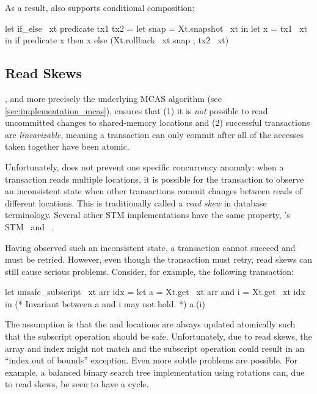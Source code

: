 As a result, \Kcas also supports conditional composition:
\begin{ocamlcode}
let if_else ~xt predicate tx1 tx2 =
  let snap = Xt.snapshot ~xt in
  let x = tx1 ~xt in
  if predicate x then x else (Xt.rollback ~xt snap ; tx2 ~xt)
\end{ocamlcode}

\subsection{Read Skews}

\Kcas, and more precisely the underlying MCAS algorithm (see \cref{sec:implementation_mcas}), ensures that (1) it is \emph{not} possible to read uncommitted changes to shared-memory locations and (2) successful transactions are \emph{linearizable}, meaning a transaction can only commit after all of the accesses taken together have been atomic.

Unfortunately, \Kcas does not prevent one specific concurrency anomaly: when a transaction reads multiple locations, it is possible for the transaction to observe an inconsistent state when other transactions commit changes between reads of different locations.
This is traditionally called a \emph{read skew} in database terminology.
Several other STM implementations have the same property, \eg \Haskell's STM~\citep{DBLP:conf/ppopp/HarrisMPH05} and \ZIO~\citep{zio}.

Having observed such an inconsistent state, a transaction cannot succeed and must be retried.
However, even though the transaction must retry, read skews can still cause serious problems.
Consider, for example, the following transaction:
\begin{ocamlcode}
let unsafe_subscript ~xt arr idx =
  let a = Xt.get ~xt arr and i = Xt.get ~xt idx in
  (* Invariant between a and i may not hold. *)
  a.(i)
\end{ocamlcode}
The assumption is that the  and  locations are always updated atomically such that the subscript operation should be safe.
Unfortunately, due to read skews, the array and index might not match and the subscript operation could result in an ``index out of bounds'' exception.
Even more subtle problems are possible.
For example, a balanced binary search tree implementation using rotations can, due to read skews, be seen to have a cycle.

